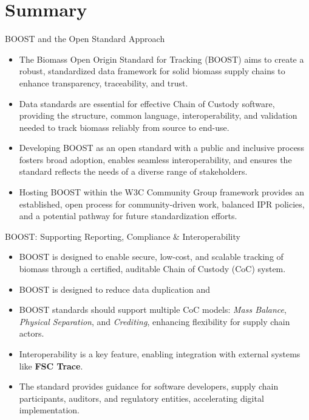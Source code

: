 \documentclass[presentation]{beamer}
\begin{document}
\section{Summary}
\label{summary-boost-and-the-open-standard-approach}
\begin{frame}[label={sec:org9377832}]{BOOST and the Open Standard Approach}
\begin{itemize}
\item The \alert{Biomass Open Origin Standard for Tracking (BOOST)} aims to create a robust, standardized data framework for solid biomass supply chains to enhance transparency, traceability, and trust.
\item \alert{Data standards are essential} for effective Chain of Custody software, providing the structure, common language, interoperability, and validation needed to track biomass reliably from source to end-use.
\item Developing BOOST as an \alert{open standard} with a public and inclusive process fosters broad adoption, enables seamless interoperability, and ensures the standard reflects the needs of a diverse range of stakeholders.
\item Hosting BOOST within the \alert{W3C Community Group} framework provides an established, open process for community-driven work, balanced IPR policies, and a potential pathway for future standardization efforts.
\end{itemize}
\end{frame}
\begin{frame}[label={sec:orgcocstandard}]{BOOST: Supporting Reporting, Compliance \& Interoperability}
\begin{itemize}
    \item BOOST is designed to enable \alert{secure, low-cost, and scalable} tracking of biomass through a certified, auditable Chain of Custody (CoC) system.
    \item BOOST is designed to reduce data duplication and 
    \item BOOST standards should support multiple CoC models: \textit{Mass Balance}, \textit{Physical Separation}, and \textit{Crediting}, enhancing flexibility for supply chain actors.
    \item Interoperability is a key feature, enabling integration with external systems like \textbf{FSC Trace}.
    \item The standard provides \alert{guidance for software developers, supply chain participants, auditors, and regulatory entities}, accelerating digital implementation.
\end{itemize}
\end{frame}
\end{document}

